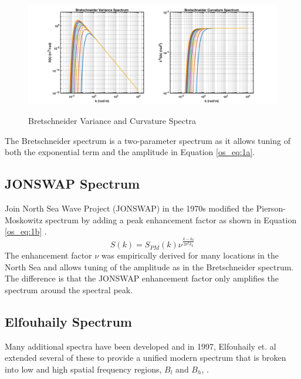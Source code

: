  \begin{figure}[H]
  \begin{center}
\includegraphics[width=6in]{../media/Ocean_Surface/bs_variance_curvature_spectrum.png}
  \end{center}
  \renewcommand{\baselinestretch}{1} \small\normalsize
  \begin{quote}
    \caption[Bretschneider Variance and Curvature Spectra]{Bretschneider Variance and Curvature Spectra\label{os_fig:1a}}
  \end{quote}
\end{figure}
 \renewcommand{\baselinestretch}{2} \small\normalsize
The Bretschneider spectrum is a two-parameter spectrum as it allows tuning of both the exponential term and the amplitude in Equation \ref{os_eq:1a}.

\subsection{JONSWAP Spectrum}
Join North Sea Wave Project (JONSWAP) in the 1970s modified the Pierson-Moskowitz spectrum by adding a peak enhancement factor as shown in Equation \ref{os_eq:1b} \cite{michel_sea_spectra}.
\begin{equation}
  \label{os_eq:1b}
  S(k) = S_{PM}(k)\nu^{\frac{k-k_0}{2\sigma^2k_0}} 
  \end{equation}
The enhancement factor $\nu$ was empirically derived for many locations in the North Sea and allows tuning of the amplitude as in the Bretschneider spectrum. The difference is that the JONSWAP enhancement factor only amplifies the spectrum around the spectral peak.

\subsection{Elfouhaily Spectrum}
Many additional spectra have been developed and in 1997, Elfouhaily et. al extended several of these to provide a unified modern spectrum that is broken into low and high spatial frequency regions, $B_l$ and $B_h$, \cite{elfouhaily}. 

